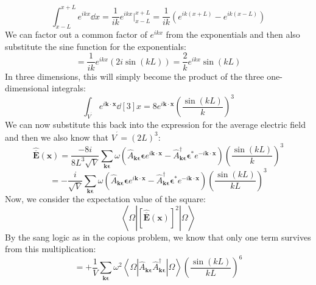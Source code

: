 \documentclass[12pt]{article}
\begin{document}
\begin{equation}
  \int_{x-L}^{x+L}e^{ikx}\dd{x} = \frac{1}{ik}e^{ikx}\Bigg|_{x-L}^{x+L} = \frac{1}{ik}\left(e^{ik(x+L)}-e^{ik(x-L)}\right)
\end{equation}
We can factor out a common factor of $e^{ikx}$ from the exponentials and then also substitute the sine function for the exponentials:
\begin{equation}
  = \frac{1}{ik}e^{ikx}\left(2i\sin(kL)\right) = \frac{2}{k}e^{ikx}\sin(kL)
\end{equation}
In three dimensions, this will simply become the product of the three one-dimensional integrals:
\begin{equation}
  \int_{V^{^{\prime}}}e^{i \mathbf{k} \cdot \mathbf{x}}\dd[3]{x} = 8 e^{i \mathbf{k} \cdot \mathbf{x}}\left( \frac{\sin(kL)}{k}\right)^3
\end{equation}
We can now substitute this back into the expression for the average electric field and then we also know that $V^{^{\prime}} = (2L)^3$:
\begin{equation}
  \hat{\overline{\mathbf{E}}}(\mathbf{x})=\frac{-8i}{8L^3\sqrt{V}} \sum_{\mathbf{k} \boldsymbol{\epsilon}}\omega \left( \hat{A}_{\mathbf{k} \boldsymbol{\epsilon}} \boldsymbol{\epsilon} e^{i \mathbf{k} \cdot \mathbf{x}}- \hat{A}_{\mathbf{k} \boldsymbol{\epsilon}}^{\dagger} \boldsymbol{\epsilon}^{*} e^{-i \mathbf{k} \cdot \mathbf{x}}\right) (\frac{\sin(kL)}{k})^3
\end{equation}
\begin{equation}
  = - \frac{i}{\sqrt{V}} \sum_{\mathbf{k} \boldsymbol{\epsilon}}\omega \left( \hat{A}_{\mathbf{k} \boldsymbol{\epsilon}} \boldsymbol{\epsilon} e^{i \mathbf{k} \cdot \mathbf{x}}- \hat{A}_{\mathbf{k} \boldsymbol{\epsilon}}^{\dagger} \boldsymbol{\epsilon}^{*} e^{-i \mathbf{k} \cdot \mathbf{x}}\right) (\frac{\sin(kL)}{kL})^3
\end{equation}
Now, we consider the expectation value of the square:
\begin{equation}
  \left\langle\Omega\left|[\hat{\overline{\mathbf{E}}}(\mathbf{x})]^{2}\right| \Omega\right\rangle
\end{equation}
By the sang logic as in the copious problem, we know that only one term survives from this multiplication:
\begin{equation}
  = +\frac{1}{V} \sum_{\mathbf{k} \boldsymbol{\epsilon}}\omega^2 \left\langle\Omega\left|\hat{A}_{\mathbf{k} \boldsymbol{\epsilon}} \hat{A}_{\mathbf{k} \boldsymbol{\epsilon}}^{\dagger}\right| \Omega\right\rangle (\frac{\sin(kL)}{kL})^6
\end{equation}
\end{document}
